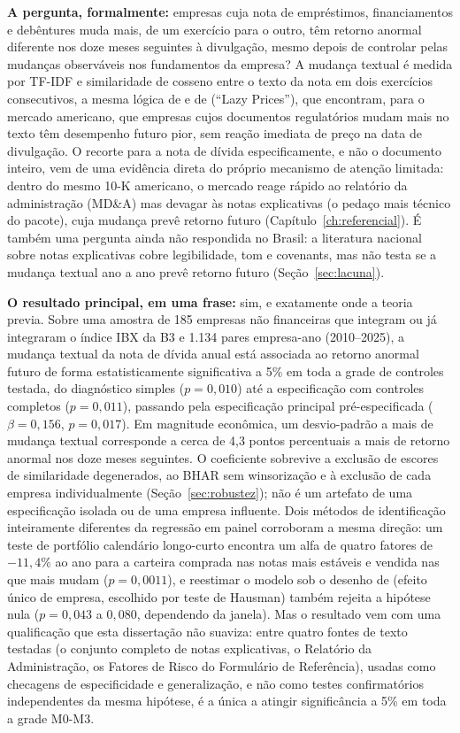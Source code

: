 \documentclass[a4paper,12pt]{report}
\begin{document}
\textbf{A pergunta, formalmente:} empresas cuja nota de empréstimos, financiamentos e debêntures muda mais, de um exercício para o outro, têm retorno anormal diferente nos doze meses seguintes à divulgação, mesmo depois de controlar pelas mudanças observáveis nos fundamentos da empresa? A mudança textual é medida por TF-IDF e similaridade de cosseno entre o texto da nota em dois exercícios consecutivos, a mesma lógica de  e de  (``Lazy Prices''), que encontram, para o mercado americano, que empresas cujos documentos regulatórios mudam mais no texto têm desempenho futuro pior, sem reação imediata de preço na data de divulgação. O recorte para a nota de dívida especificamente, e não o documento inteiro, vem de uma evidência direta do próprio mecanismo de atenção limitada: dentro do mesmo 10-K americano, o mercado reage rápido ao relatório da administração (MD\&A) mas devagar às notas explicativas (o pedaço mais técnico do pacote), cuja mudança prevê retorno futuro \cite{amelzadeh2016} (Capítulo~\ref{ch:referencial}). É também uma pergunta ainda não respondida no Brasil: a literatura nacional sobre notas explicativas cobre legibilidade, tom e covenants, mas não testa se a mudança textual ano a ano prevê retorno futuro (Seção~\ref{sec:lacuna}).

\textbf{O resultado principal, em uma frase:} sim, e exatamente onde a teoria previa. Sobre uma amostra de 185 empresas não financeiras que integram ou já integraram o índice IBX da B3 e 1.134 pares empresa-ano (2010--2025), a mudança textual da nota de dívida anual está associada ao retorno anormal futuro de forma estatisticamente significativa a 5\% em toda a grade de controles testada, do diagnóstico simples ($p=0{,}010$) até a especificação com controles completos ($p=0{,}011$), passando pela especificação principal pré-especificada ($\beta=0{,}156$, $p=0{,}017$). Em magnitude econômica, um desvio-padrão a mais de mudança textual corresponde a cerca de 4,3 pontos percentuais a mais de retorno anormal nos doze meses seguintes. O coeficiente sobrevive a exclusão de escores de similaridade degenerados, ao BHAR sem winsorização e à exclusão de cada empresa individualmente (Seção~\ref{sec:robustez}); não é um artefato de uma especificação isolada ou de uma empresa influente. Dois métodos de identificação inteiramente diferentes da regressão em painel corroboram a mesma direção: um teste de portfólio calendário longo-curto encontra um alfa de quatro fatores de $-11{,}4\%$ ao ano para a carteira comprada nas notas mais estáveis e vendida nas que mais mudam ($p=0{,}0011$), e reestimar o modelo sob o desenho de  (efeito único de empresa, escolhido por teste de Hausman) também rejeita a hipótese nula ($p=0{,}043$ a $0{,}080$, dependendo da janela). Mas o resultado vem com uma qualificação que esta dissertação não suaviza: entre quatro fontes de texto testadas (o conjunto completo de notas explicativas, o Relatório da Administração, os Fatores de Risco do Formulário de Referência), usadas como checagens de especificidade e generalização, e não como testes confirmatórios independentes da mesma hipótese, é a única a atingir significância a 5\% em toda a grade M0-M3.
\end{document}
